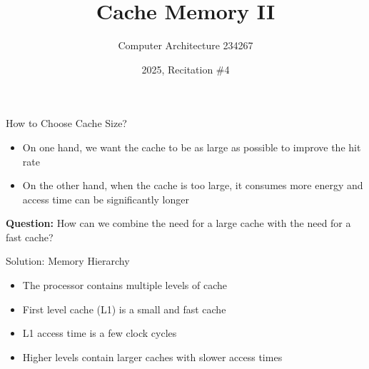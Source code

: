 \documentclass[aspectratio=169,12pt]{beamer}
\title{Cache Memory II}
\author{Computer Architecture 234267}
\date{2025, Recitation \#4}
\begin{document}
\frame{\titlepage}

\begin{frame}{How to Choose Cache Size?}
\begin{itemize}
    \item On one hand, we want the cache to be as large as possible to improve the hit rate
    \item On the other hand, when the cache is too large, it consumes more energy and access time can be significantly longer
\end{itemize}
\vspace{0.5cm}
\centering
\textbf{Question:} How can we combine the need for a large cache with the need for a fast cache?
\end{frame}

\begin{frame}{Solution: Memory Hierarchy}
\begin{itemize}
    \item The processor contains multiple levels of cache
    \item First level cache (L1) is a small and fast cache
    \item L1 access time is a few clock cycles
    \item Higher levels contain larger caches with slower access times
\end{itemize}
\vspace{0.5cm}
\begin{center}
\end{center}
\end{frame}
\end{document}
